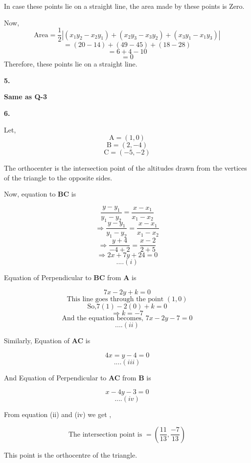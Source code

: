 \documentclass{article}
\begin{document}
\begin{flushleft}
In case these points lie on a straight line, the area made by these points is Zero.\par
\vspace{0.5cm}
Now,
\[\text{Area} = \frac{1}{2} |(x_1y_2-x_2y_1)+(x_2y_3-x_3y_2)+(x_3y_1-x_1y_3)| \]
\[=(20-14)+(49-45)+(18-28)\]
\[=6+4-10\]
\[=0\]
\vspace{0.5cm}
Therefore, these points lie on a straight line.\par
\vspace{1cm}
\textbf{5.}\par
\vspace{0.5cm}
\textbf{Same as Q-3}\par
\newpage
\textbf{6.}\par
\vspace{0.5cm}
Let, 
\[ \text{A}=(1,0) \]
\[ \text{B}=(2,-4) \]
\[ \text{C}=(-5,-2)\]\par
The orthocenter is the intersection point of the altitudes drawn from the vertices of the triangle to the opposite sides.\par
\vspace{0.4cm}
Now, equation to \textbf{BC} is \par
\[\frac{y-y_1}{y_1-y_2}=\frac{x-x_1}{x_1-x_2}\]
\[\Longrightarrow\frac{y-y_1}{y_1-y_2}=\frac{x-x_1}{x_1-x_2}\]
\[\Longrightarrow\frac{y+4}{-4+2}=\frac{x-2}{2+5}\]
\[\Longrightarrow2x+7y+24=0\]
\[....(i)\]\par
Equation of Perpendicular to \textbf{BC} from \textbf{A} is\par
\[7x-2y+k=0\]
\[\text{This line goes through the point } (1,0)\]
\[\text{So,} 7(1)-2(0)+k=0\]
\[\Longrightarrow k=-7\]
\[\text{And the equation becomes, }7x-2y-7=0 \]
\[....(ii)\]\par
Similarly,
Equation of \textbf{AC} is \par
\[4x=y-4=0\]
\[....(iii)\]\par
And Equation of Perpendicular to \textbf{AC} from \textbf{B} is\par
\[x-4y-3=0\]
\[....(iv)\]\par
From equation (ii) and (iv) we get ,\par
\[\text{The intersection point is } = (\frac{11}{13} , \frac{-7}{13})\]\par
\vspace{0.5cm}
This point is the orthocentre of the triangle.\par



\end{flushleft}
\end{document}
